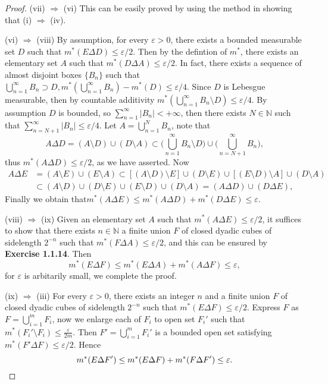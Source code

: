\documentclass[a4paper]{article}
\begin{document}
\begin{proof}
(vii) $\Rightarrow$ (vi) This can be easily proved by using the method in showing that (i) $\Rightarrow$ (iv).

(vi) $\Rightarrow$ (viii) By assumption, for every $\varepsilon > 0$, there exists a bounded measurable set $D$
such that $m^*(E \Delta D) \leq \varepsilon / 2$. Then by the defintion of $m^*$, there exists an elementary set $A$
such that $m^*(D \Delta A) \leq \varepsilon / 2$. In fact, there exists a sequence of almost disjoint boxes $\{B_n\}$ 
such that $\bigcup_{n = 1}^\infty B_n \supset D, m^*(\bigcup_{n = 1}^\infty B_n) - m^*(D) \leq \varepsilon / 4$. Since
$D$ is Lebesgue measurable, then by countable additivity $m^*(\bigcup_{n = 1}^\infty B_n \setminus D) \leq \varepsilon / 4$.
By assumption $D$ is bounded, so $\sum_{n = 1}^\infty |B_n| < +\infty$, then there exists $N \in \mathbb{N}$ such
that $\sum_{n = N + 1}^\infty |B_n| \leq \varepsilon / 4$. Let $A = \bigcup_{n = 1}^N B_n$, note that$$
A \Delta D = (A \setminus D) \cup (D \setminus A) \subset \Big(\bigcup_{n = 1}^\infty B_n \setminus D\Big) \cup
\Big(\bigcup_{n = N + 1}^\infty B_n\Big),
$$thus $m^*(A \Delta D) \leq \varepsilon / 2$, as we have asserted. Now \begin{align*}
A \Delta E &= (A \setminus E) \cup (E \setminus A) \subset [(A \setminus D) \setminus E] \cup (D \setminus E) \cup 
[(E \setminus D) \setminus A] \cup (D \setminus A)\\
&\subset (A \setminus D) \cup (D \setminus E) \cup (E \setminus D) \cup (D \setminus A) = (A \Delta D) \cup (D \Delta E),
\end{align*}
Finally we obtain that$
m^*(A \Delta E) \leq m^*(A \Delta D) + m^*(D \Delta E) \leq \varepsilon.
$

(viii) $\Rightarrow$ (ix) Given an elementary set $A$ such that $m^*(A \Delta E) \leq \varepsilon / 2$, it suffices
to show that there exists $n \in \mathbb{N}$ a finite union $F$ of closed dyadic cubes of sidelength $2^{-n}$ such
that $m^*(F \Delta A) \leq \varepsilon / 2$, and this can be ensured by {\bfseries Exercise 1.1.14}. Then$$
m^*(E \Delta F) \leq m^*(E \Delta A) + m^*(A \Delta F) \leq \varepsilon,
$$for $\varepsilon$ is arbitarily small, we complete the proof.

(ix) $\Rightarrow$ (iii) For every $\varepsilon > 0$, there exists an integer $n$ and a finite union $F$ of closed 
dyadic cubes of sidelength $2^{-n}$ such that $m^*(E \Delta F) \leq \varepsilon / 2$. Express $F$ as
$F = \bigcup_{i = 1}^m F_i$, now we enlarge each of $F_i$ to open set $F_i'$ such that 
$m^*(F_i' \setminus F_i) \leq \frac{\varepsilon}{2m}$. Then $F' = \bigcup_{i = 1}^m F_i'$ is a bounded open set satisfying
$m^*(F' \Delta F) \leq \varepsilon / 2$. Hence\[
m^*(E \Delta F') \leq m^*(E \Delta F) + m^*(F \Delta F') \leq \varepsilon.\qedhere
\]
\end{proof}
\end{document}
